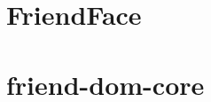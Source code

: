 \documentclass[../index.tex]{subfiles}
\begin{document}
\section{FriendFace}
\section{friend-dom-core}
\end{document}
